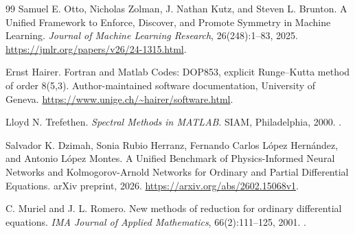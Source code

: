 \documentclass[11pt,a4paper,oneside]{report}
\numberwithin{equation}{chapter}
\begin{document}
\begin{thebibliography}{99}
Samuel E. Otto, Nicholas Zolman, J. Nathan Kutz, and Steven L. Brunton.
\newblock A Unified Framework to Enforce, Discover, and Promote Symmetry in Machine Learning.
\newblock \emph{Journal of Machine Learning Research}, 26(248):1--83, 2025.
\newblock \url{https://jmlr.org/papers/v26/24-1315.html}.

Ernst Hairer.
\newblock Fortran and Matlab Codes: DOP853, explicit Runge--Kutta method of order 8(5,3).
\newblock Author-maintained software documentation, University of Geneva.
\newblock \url{https://www.unige.ch/~hairer/software.html}.

Lloyd N. Trefethen.
\newblock \emph{Spectral Methods in MATLAB}.
\newblock SIAM, Philadelphia, 2000.
\newblock {}.

Salvador K. Dzimah, Sonia Rubio Herranz,
Fernando Carlos L\'opez Hern\'andez, and Antonio L\'opez Montes.
\newblock A Unified Benchmark of Physics-Informed Neural Networks and
Kolmogorov-Arnold Networks for Ordinary and Partial Differential Equations.
\newblock arXiv preprint, 2026.
\newblock \url{https://arxiv.org/abs/2602.15068v1}.

C. Muriel and J. L. Romero.
\newblock New methods of reduction for ordinary differential equations.
\newblock \emph{IMA Journal of Applied Mathematics}, 66(2):111--125, 2001.
\newblock {}.

\end{thebibliography}
\endgroup
\end{document}
